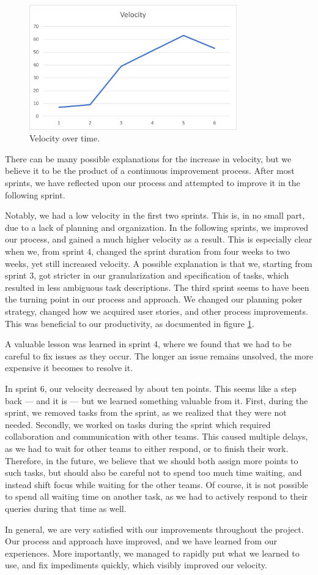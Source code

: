 \begin{figure}[h!]
\centering
\includegraphics[width=0.8\textwidth]{Images/VelocityAnalysis.png}
\caption{Velocity over time.}
\label{img:velocityOverTime}
\end{figure}

There can be many possible explanations for the increase in velocity, but we believe it to be the product of a continuous improvement process.
After most sprints, we have reflected upon our process and attempted to improve it in the following sprint.

Notably, we had a low velocity in the first two sprints. This is, in no small part, due to a lack of planning and organization. In the following sprints, we improved our process, and gained a much higher velocity as a result.
This is especially clear when we, from sprint 4, changed the sprint duration from four weeks to two weeks, yet still increased velocity.
A possible explanation is that we, starting from sprint 3, got stricter in our granularization and specification of tasks, which resulted in less ambiguous task descriptions.
The third sprint seems to have been the turning point in our process and approach. We changed our planning poker strategy, changed how we acquired user stories, and other process improvements. This was beneficial to our productivity, as documented in figure \ref{img:velocityOverTime}.

A valuable lesson was learned in sprint 4, where we found that we had to be careful to fix issues as they occur. The longer an issue remains unsolved, the more expensive it becomes to resolve it.

In sprint 6, our velocity decreased by about ten points. This seems like a step back --- and it is --- but we learned something valuable from it.
First, during the sprint, we removed tasks from the sprint, as we realized that they were not needed. 
Secondly, we worked on tasks during the sprint which required collaboration and communication with other teams. This caused multiple delays, as we had to wait for other teams to either respond, or to finish their work. Therefore, in the future, we believe that we should both assign more points to such tasks, but should also be careful not to spend too much time waiting, and instead shift focus while waiting for the other teams. Of course, it is not possible to spend all waiting time on another task, as we had to actively respond to their queries during that time as well.

In general, we are very satisfied with our improvements throughout the project. Our process and approach have improved, and we have learned from our experiences. More importantly, we managed to rapidly put what we learned to use, and fix impediments quickly, which visibly improved our velocity.